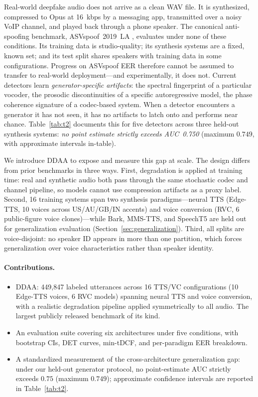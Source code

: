 \documentclass{article}
\newcommand{\ddaa}{\textsc{DDAA}}
\begin{document}
Real-world deepfake audio does not arrive as a clean WAV file.  It is
synthesized, compressed to Opus at 16~kbps by a messaging app, transmitted
over a noisy VoIP channel, and played back through a phone speaker.  The
canonical anti-spoofing benchmark, ASVspoof~2019~LA
\citep{asvspoof2019}, evaluates under none of these conditions.  Its
training data is studio-quality; its synthesis systems are a fixed,
known set; and its test split shares speakers with training data in some
configurations.  Progress on ASVspoof EER therefore cannot be assumed
to transfer to real-world deployment---and experimentally, it does not.
Current detectors learn
\emph{generator-specific artifacts}: the spectral fingerprint of a
particular vocoder, the prosodic discontinuities of a specific
autoregressive model, the phase coherence signature of a codec-based
system.  When a detector encounters a generator it has not seen, it has
no artifacts to latch onto and performs near chance.
Table~\ref{tab:t2} documents this for five detectors across three
held-out synthesis systems: \emph{no point estimate strictly exceeds
AUC~0.750} (maximum $0.749$, with approximate intervals in-table).

We introduce \ddaa{} to expose and measure this gap at scale.
The design differs from prior benchmarks in three ways.
First, degradation is applied at training time: real and synthetic audio both
pass through the same stochastic codec and channel pipeline, so models cannot
use compression artifacts as a proxy label.
Second, 16 training systems span two synthesis paradigms---neural TTS
(Edge-TTS, 10 voices across US/AU/GB/IN accents) and voice conversion (RVC,
6 public-figure voice clones)---while Bark, MMS-TTS, and SpeechT5 are held
out for generalization evaluation (Section~\ref{sec:generalization}).
Third, all splits are voice-disjoint: no speaker ID appears in more than one
partition, which forces generalization over voice characteristics rather than
speaker identity.

\paragraph{Contributions.}
\begin{itemize}
  \item \ddaa: 449,847 labeled utterances across 16 TTS/VC configurations
  (10 Edge-TTS voices, 6 RVC models) spanning neural TTS and voice conversion,
  with a realistic degradation pipeline applied symmetrically to all audio.
  The largest publicly released benchmark of its kind.
  \item An evaluation suite covering six architectures under five conditions,
  with bootstrap CIs, DET curves, min-tDCF, and per-paradigm EER breakdown.
  \item A standardized measurement of the cross-architecture generalization gap:
  under our held-out generator protocol, no point-estimate AUC strictly exceeds
  $0.75$ (maximum $0.749$); approximate confidence intervals are reported in
  Table~\ref{tab:t2}.
\end{itemize}
\end{document}
